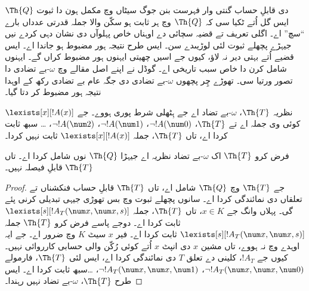 \documentclass[../../../include/open-logic-section]{subfiles}
\begin{document}


\begin{explain}
$\Th{Q}$ دی قابلِ حساب گنتی وار فہرست بنن جوگ سیٹاں وچ مکمل ہون
دا ثبوت ایس گل اُتے ٹکیا سی کہ $\Th{Q}$ وچ ہر ثابت ہو سکّن والا
جملہ قدرتی عدداں بارے “سچ” اے۔ اگلی تعریف تے قضیہ سچائی دے اوہناں خاص
پہلوآں دی نشان دہی کردے نیں جیہڑے پچھلے ثبوت لئی لوڑیںدے سن۔
ایس طرح نتیجہ ہور مضبوط ہو جاندا اے۔ ایس قضیے اُتے بہتی دیر
نہ لاؤ، کیوں جے اسیں چھیتی ایہنوں ہور مضبوط کراں گے۔ ایہنوں
شامل کرن دا خاص سبب تاریخی اے۔ گوڈل نے اپنے اصل مقالے وچ
$\omega$-بے تضادی دا تصور ورتیا سی۔ تھوڑے چِر پچھوں
$\omega$-بے تضادی دی جگہ عام بے تضادی رکھ کے اوہدا نتیجہ
ہور مضبوط کر دتا گیا۔
\end{explain}

\begin{defn}
نظریہ $\Th{T}$، $\omega$-بے تضاد اے جے ہِٹھلی شرط پوری ہووے۔
جے $\lexists[x][!A(x)]$ کوئی وی جملہ اے تے $\Th{T}$،
$\lnot
!A(\num 0)$، $\lnot !A(\num 1)$، $\lnot !A(\num 2)$، \dots
سبھ ثابت کردا اے، تاں $\Th{T}$، جملہ
$\lexists[x][!A(x)]$ ثابت نہیں کردا۔
\end{defn}

\begin{thm}
فرض کرو $\Th{T}$ اک $\omega$-بے تضاد نظریہ اے جیہڑا $\Th{Q}$
نوں شامل کردا اے۔ تاں $\Th{T}$ قابلِ فیصلہ نہیں۔
\end{thm}

\begin{proof}
جے $\Th{T}$ وچ $\Th{Q}$ شامل اے، تاں $\Th{T}$ قابلِ حساب
فنکشناں تے تعلقاں دی نمائندگی کردا اے۔ سانوں پچھلے ثبوت وچ
بس تھوڑی جیہی تبدیلی کرنی پئے گی۔ پہلاں وانگ جے $x \in K$،
تاں $\Th{T}$، جملہ $\lexists[s][!A_T(\num
  x,\num x, s)]$ ثابت کردا اے۔ دوجے پاسے فرض کرو $\Th{T}$
جملہ $\lexists[s][!A_T(\num x, \num x, s)]$ ثابت کردا اے۔
فیر $x$ سیٹ $K$ وچ ضرور اے۔ جے ایہ اوہدے وچ نہ ہووے، تاں
مشین $x$ دی انپٹ $x$ اُتے کوئی رُکّن والی حسابی کارروائی نہیں۔
کیوں جے $!A_T$، کلینی دے تعلق $T$ دی نمائندگی کردا اے،
ایس لئی $\Th{T}$، فارمولے $\lnot !A_T(\num x, \num x, \num 0)$،
$\lnot !A_T(\num x, \num
x, \num 1)$، \dots سبھ ثابت کردا اے۔ ایس طرح $\Th{T}$،
$\omega$-بے تضاد نہیں رہندا۔
\end{proof}
\end{document}

